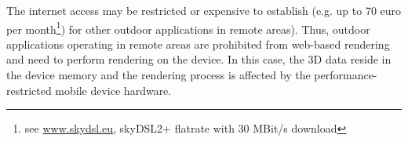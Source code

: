 \documentclass[review]{elsarticle}
\begin{document}

The internet access may be restricted or expensive to establish (e.g. up to 70 euro per month\footnote{see \url{www.skydsl.eu}, skyDSL2+ flatrate with 30 MBit/s download}) for other outdoor applications in remote areas). Thus, outdoor applications operating in remote areas are prohibited from web-based rendering and need to perform rendering on the device. In this case, the 3D data reside in the device memory and the rendering process is affected by the performance-restricted mobile device hardware.

\end{document}
